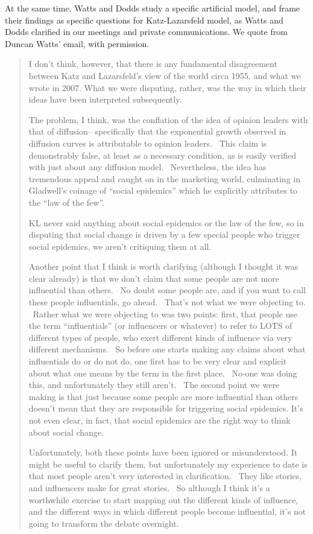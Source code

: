 \documentclass[10pt,oneside]{memoir}
\begin{document}
At the same time, Watts and Dodds study a specific artificial model, and frame their findings as specific questions for Katz-Lazarsfeld model, as Watts and Dodds clarified in our meetings and private communications.  We quote from Duncan Watts' email, with permission.


\begin{quote}
I don't think, however, that there is any fundamental disagreement between Katz and Lazarsfeld's view of the world circa 1955, and what we wrote in 2007. What we were disputing, rather, was the way in which their ideas have been interpreted subsequently. 


The problem, I think, was the conflation of the idea of opinion leaders with that of diffusion-- specifically that the exponential growth observed in diffusion curves is attributable to opinion leaders. ~This claim is demonstrably false, at least as a necessary condition, as is easily verified with just about any diffusion model. ~Nevertheless, the idea has tremendous appeal and caught on in the marketing world, culminating in Gladwell's coinage of ``social epidemics'' which he explicitly attributes to the ``law of the few''. ~


KL never said anything about social epidemics or the law of the few, so in disputing that social change is driven by a few special people who trigger social epidemics, we aren't critiquing them at all. ~


Another point that I think is worth clarifying (although I thought it was clear already) is that we don't claim that some people are not more influential than others. ~No doubt some people are, and if you want to call these people influentials, go ahead. ~That's not what we were objecting to. ~Rather what we were objecting to was two points: first, that people use the term ``influentials'' (or influencers or whatever) to refer to LOTS of different types of people, who exert different kinds of influence via very different mechanisms. ~So before one starts making any claims about what influentials do or do not do, one first has to be very clear and explicit about what one means by the term in the first place. ~No-one was doing this, and unfortunately they still aren't. ~The second point we were making is that just because some people are more influential than others doesn't mean that they are responsible for triggering social epidemics. It's not even clear, in fact, that social epidemics are the right way to think about social change. ~


Unfortunately, both these points have been ignored or misunderstood. It might be useful to clarify them, but unfortunately my experience to date is that most people aren't very interested in clarification. ~They like stories, and influencers make for great stories. ~So although I think it's a worthwhile exercise to start mapping out the different kinds of influence, and the different ways in which different people become influential, it's not going to transform the debate overnight.
\end{quote}
\end{document}
